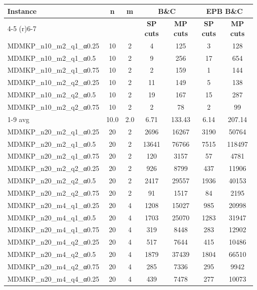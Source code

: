 \begin{table}[!ht]
\centering
\hspace*{-1cm}\begin{tabular}{lcccccc}
\toprule
\textbf{Instance} & \textbf{n} & \textbf{m} & \multicolumn{2}{c}{\textbf{B\&C}}  & \multicolumn{2}{c}{\textbf{EPB B\&C}}
\\
\cmidrule(r){4-5} \cmidrule(r){6-7} 
~ & ~ & ~ & \textbf{SP cuts} &\textbf{MP cuts} & \textbf{SP cuts} &\textbf{MP cuts} \\
\midrule

MDMKP\_n10\_m2\_q1\_α0.25 & 10 & 2 & 4 & 125 & 3 & 128 \\
MDMKP\_n10\_m2\_q1\_α0.5 & 10 & 2 & 9 & 256 & 17 & 654 \\
MDMKP\_n10\_m2\_q1\_α0.75 & 10 & 2 & 2 & 159 & 1 & 144 \\
MDMKP\_n10\_m2\_q2\_α0.25 & 10 & 2 & 11 & 149 & 5 & 138 \\
MDMKP\_n10\_m2\_q2\_α0.5 & 10 & 2 & 19 & 167 & 15 & 287 \\
MDMKP\_n10\_m2\_q2\_α0.75 & 10 & 2 & 2 & 78 & 2 & 99 \\
\cline{1-9} avg & 10.0 & 2.0 & 6.71& 133.43 & 6.14& 207.14\\ \hline
MDMKP\_n20\_m2\_q1\_α0.25 & 20 & 2 & 2696 & 16267 & 3190 & 50764 \\
MDMKP\_n20\_m2\_q1\_α0.5 & 20 & 2 & 13641 & 76766 & 7515 & 118497 \\
MDMKP\_n20\_m2\_q1\_α0.75 & 20 & 2 & 120 & 3157 & 57 & 4781 \\
MDMKP\_n20\_m2\_q2\_α0.25 & 20 & 2 & 926 & 8799 & 437 & 11906 \\
MDMKP\_n20\_m2\_q2\_α0.5 & 20 & 2 & 2417 & 29557 & 1936 & 40153 \\
MDMKP\_n20\_m2\_q2\_α0.75 & 20 & 2 & 91 & 1517 & 84 & 2195 \\
MDMKP\_n20\_m4\_q1\_α0.25 & 20 & 4 & 1208 & 15027 & 985 & 20998 \\
MDMKP\_n20\_m4\_q1\_α0.5 & 20 & 4 & 1703 & 25070 & 1283 & 31947 \\
MDMKP\_n20\_m4\_q1\_α0.75 & 20 & 4 & 319 & 8448 & 283 & 12902 \\
MDMKP\_n20\_m4\_q2\_α0.25 & 20 & 4 & 517 & 7644 & 415 & 10486 \\
MDMKP\_n20\_m4\_q2\_α0.5 & 20 & 4 & 1879 & 37439 & 1804 & 66510 \\
MDMKP\_n20\_m4\_q2\_α0.75 & 20 & 4 & 285 & 7336 & 295 & 9942 \\
MDMKP\_n20\_m4\_q4\_α0.25 & 20 & 4 & 439 & 7478 & 277 & 10073 \\

\end{tabular}
\end{table}
